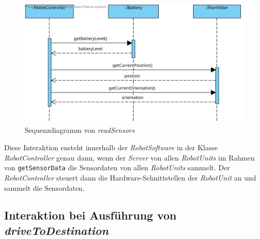 \begin{figure}[H]
	\centering
	\includegraphics[width=1\textwidth]{img/8-readSensor}
	\caption{Sequenzdiagramm von \emph{readSensors}}
	\label{ReadSensorsInteraktion}
\end{figure}
Diese Interaktion ensteht innerhalb der \textit{RobotSoftware} in der Klasse \textit{RobotController} genau dann, wenn der \textit{Server} von allen \textit{RobotUnits} im Rahmen von \texttt{getSensorData} die Sensordaten von allen  \textit{RobotUnits} sammelt. Der \textit{RobotController} steuert dann die Hardware-Schnittstellen der \textit{RobotUnit} an und sammelt die Sensordaten.
\\
	
\subsection*{Interaktion bei Ausführung von \textit{driveToDestination}}


